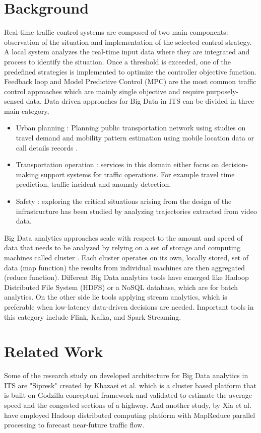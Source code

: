\documentclass[sigconf]{acmart}
\begin{document}
\section{Background}
Real-time traffic control systems are composed of two main components: observation of the situation and implementation of the selected
control strategy. A local system analyzes the real-time input data
where they are integrated and process to identify the situation. Once a threshold is exceeded, one of the predefined strategies is implemented to optimize the controller objective function. Feedback loop and Model Predictive Control (MPC)\cite{mpc} are the most common traffic control approaches which are mainly single objective and require purposely-sensed data.
Data driven approaches for Big Data in ITS can be divided in three main category,

\begin{itemize}
    \item Urban planning : Planning public transportation network using studies on travel demand and mobility pattern estimation using mobile location data\cite{mpc} or call details records \cite{phcl}.
    \item Transportation operation : services in this domain either focus on decision-making support systems for traffic operations. For example travel time prediction\cite{timepred}, traffic incident and anomaly detection\cite{trafano}.
    \item Safety : exploring the critical situations arising from the design of the infrastructure has been studied by analyzing trajectories extracted from video data\cite{largscal}.
\end{itemize}

Big Data analytics approaches scale with respect to the amount and speed of data that needs to be analyzed by relying on a set of storage and computing machines called cluster \cite{clstr}. Each cluster operates on its own, locally stored, set of data (map function) the results from individual machines are then aggregated (reduce function). Different Big Data analytics tools have emerged like Hadoop Distributed File System (HDFS) or a NoSQL database, which are for batch analytics. On the other side lie tools applying stream analytics, which is preferable when low-latency \cite{lowlat} data-driven decisions are needed. Important tools in this category include Flink, Kafka, and Spark Streaming. 

\section{Related Work}
Some of the research study on developed architecture for Big Data analytics in ITS are "Sipresk" created by Khazaei et al. \cite{Sipresk} which is a cluster based platform that is built on Godzilla conceptual framework \cite{clstr} and validated to estimate the average speed and the congested sections of a highway. And another study, by Xia et al. \cite{mapreduce} have employed Hadoop distributed computing platform with MapReduce parallel processing to forecast near-future traffic flow.
\end{document}
